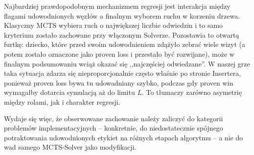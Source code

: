 \documentclass{article}
\begin{document}
Najbardziej prawdopodobnym mechanizmem regresji jest interakcja między
flagami udowodnionych węzłów a finalnym wyborem ruchu w korzeniu drzewa.
Klasyczny MCTS wybiera ruch o największej liczbie odwiedzin i to samo
kryterium zostało zachowane przy włączonym Solverze. Pozostawia to
otwartą furtkę: dziecko, które przed swoim udowodnieniem zdążyło zebrać
wiele wizyt (a potem zostało oznaczone jako proven loss i przestało być
rozwijane), może w finalnym podsumowaniu wciąż okazać się ,,najczęściej
odwiedzane''. W naszej grze taka sytuacja zdarza się nieproporcjonalnie
często właśnie po stronie Insertera, ponieważ proven loss bywa tu
udowadniany szybko, podczas gdy proven win wymagałby dotarcia symulacją
aż do limitu $L$. To tłumaczy zarówno asymetrię między rolami, jak
i charakter regresji.

Wydaje się więc, że obserwowane zachowanie należy zaliczyć do kategorii
problemów implementacyjnych -- konkretnie, do niedostatecznie spójnego
potraktowania udowodnionych etykiet na różnych etapach algorytmu --
a nie do wad samego MCTS-Solver jako modyfikacji.



\end{document}
